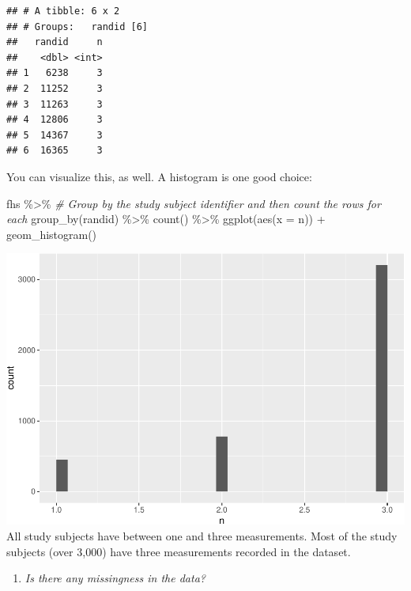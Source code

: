\documentclass[
]{book}
\newenvironment{Shaded}{\begin{snugshade}}{\end{snugshade}}
\newcommand{\AttributeTok}[1]{\textcolor[rgb]{0.77,0.63,0.00}{#1}}
\newcommand{\CommentTok}[1]{\textcolor[rgb]{0.56,0.35,0.01}{\textit{#1}}}
\newcommand{\FunctionTok}[1]{\textcolor[rgb]{0.00,0.00,0.00}{#1}}
\newcommand{\NormalTok}[1]{#1}
\newcommand{\SpecialCharTok}[1]{\textcolor[rgb]{0.00,0.00,0.00}{#1}}
\providecommand{\tightlist}{%
  \setlength{\itemsep}{0pt}\setlength{\parskip}{0pt}}
\begin{document}
\begin{verbatim}
## # A tibble: 6 x 2
## # Groups:   randid [6]
##   randid     n
##    <dbl> <int>
## 1   6238     3
## 2  11252     3
## 3  11263     3
## 4  12806     3
## 5  14367     3
## 6  16365     3
\end{verbatim}

You can visualize this, as well. A histogram is one good choice:

\begin{Shaded}
\begin{Highlighting}[]
\NormalTok{fhs }\SpecialCharTok{\%\textgreater{}\%} 
  \CommentTok{\# Group by the study subject identifier and then count the rows for each}
  \FunctionTok{group\_by}\NormalTok{(randid) }\SpecialCharTok{\%\textgreater{}\%} 
  \FunctionTok{count}\NormalTok{() }\SpecialCharTok{\%\textgreater{}\%} 
  \FunctionTok{ggplot}\NormalTok{(}\FunctionTok{aes}\NormalTok{(}\AttributeTok{x =}\NormalTok{ n)) }\SpecialCharTok{+} 
  \FunctionTok{geom\_histogram}\NormalTok{()}
\end{Highlighting}
\end{Shaded}

\includegraphics{adv_epi_analysis_files/figure-latex/unnamed-chunk-169-1.pdf}
All study subjects have between one and three measurements. Most of the study
subjects (over 3,000) have three measurements recorded in the dataset.

\begin{enumerate}
\def\labelenumi{\arabic{enumi}.}
\setcounter{enumi}{1}
\tightlist
\item
  \emph{Is there any missingness in the data?}
\end{enumerate}
\end{document}
